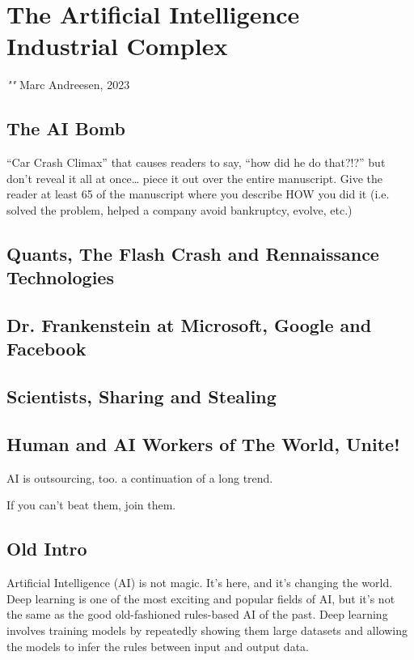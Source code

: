 \setchapterpreamble[u]{\margintoc}
\chapter{The Artificial Intelligence Industrial Complex}

\textit{""} Marc Andreesen, 2023 \cite{welsh2023}

\section{The AI Bomb}

“Car Crash Climax” that causes readers to say, “how did he do that?!?” but don’t reveal it all at once… piece it out over the entire manuscript. Give the reader at least 65 of the manuscript where you describe HOW you did it (i.e. solved the problem, helped a company avoid bankruptcy, evolve, etc.)

\section{Quants, The Flash Crash and Rennaissance Technologies} 

\section{Dr. Frankenstein at Microsoft, Google and Facebook}

\section{Scientists, Sharing and Stealing}

\section{Human and AI Workers of The World, Unite!}

AI is outsourcing, too. a continuation of a long trend.

If you can't beat them, join them.

\section{Old Intro}

Artificial Intelligence (AI) is not magic. It's here, and it's changing the world. Deep learning is one of the most exciting and popular fields of AI, but it's not the same as the good old-fashioned rules-based AI of the past. Deep learning involves training models by repeatedly showing them large datasets and allowing the models to infer the rules between input and output data.

